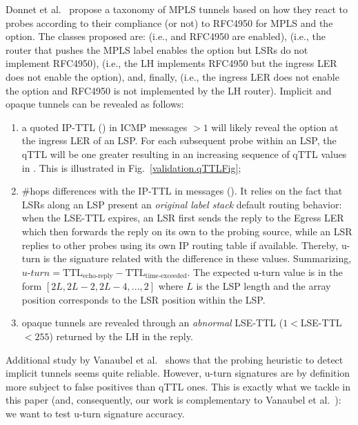 Donnet et al.~\cite{Donnet12} propose a taxonomy of MPLS tunnels based on how
they react to \traceroute probes according to their compliance (or not) to
RFC4950 for MPLS and the \tpropagate option.  The classes proposed are:
 (i.e., \tpropagate and RFC4950 are enabled),
 (i.e., the router that pushes the MPLS label enables the
\tpropagate option but LSRs do not implement RFC4950), 
(i.e., the LH implements RFC4950 but the ingress LER does not enable the
\tpropagate option), and, finally,  (i.e., the ingress
LER does not enable the \tpropagate option and RFC4950 is not implemented by the
LH router).  Implicit and opaque tunnels can be revealed as follows:
\begin{enumerate}
  \item a quoted IP-TTL () in ICMP \ttlexceeded messages $>1$ will
  likely reveal the \tpropagate option at the ingress LER of an LSP. For each
  subsequent \traceroute probe within an LSP, the qTTL will be one greater
  resulting in an increasing sequence of qTTL values in \traceroute.  This is
  illustrated in Fig.~\ref{validation.qTTLFig};
  \item  \#hops differences with the IP-TTL in \echoreply messages
  ().  It relies on the fact that LSRs along an LSP present an
  \textit{original label stack} default routing behavior: when the LSE-TTL
  expires, an LSR first sends the \ttlexceeded reply to the Egress LER which
  then forwards the reply on its own to the probing source, while an LSR
  replies to other probes using its own IP routing table if available. Thereby,
  u-turn is the signature related with the difference in these values. Summarizing, 
  $\textit{u-turn}=\text{TTL}_{\text{echo-reply}}-\text{TTL}_{\text{time-exceeded}}$.
  The expected u-turn value is in the form $[2L, 2L-2, 2L-4,..., 2]$ where $L$
  is the LSP length and the array position corresponds to the LSR position
  within the LSP.
  \item opaque tunnels are revealed through an \textit{abnormal} LSE-TTL
  ($1<$LSE-TTL$<255$) returned by the LH in the \ttlexceeded reply.
\end{enumerate}

Additional study by Vanaubel et al.~\cite{VAN2013} shows that the probing
heuristic to detect implicit tunnels seems quite reliable.  However, u-turn
signatures are by definition more subject to false positives than qTTL ones. 
This is exactly what we tackle in this paper (and, consequently, our work is
complementary to Vanaubel et al.~\cite{VAN2013}): we want to test u-turn
signature accuracy.

